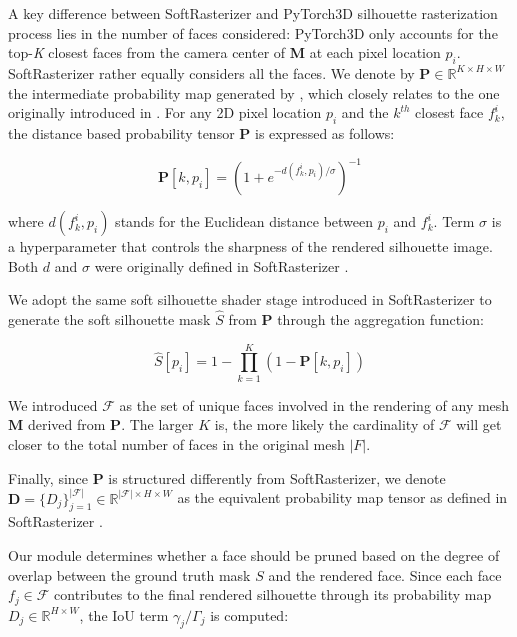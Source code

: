 A key difference between SoftRasterizer and PyTorch3D silhouette rasterization process lies in the number of faces considered: PyTorch3D only accounts for the top-\textit{K} closest faces from the camera center of \textbf{M} at each pixel location $p_i$. SoftRasterizer rather equally considers all the faces. 
We denote by $\mathbf{P}\in \mathbb{R}^{K \times H \times W}$ the intermediate probability map generated by \citep{ravi2020accelarating}, which closely relates to the one originally introduced in \citep{liu2019soft}. For any 2D pixel location $p_{i}$ and the $k^{th}$ closest face $f_{k}^{i}$, the distance based probability tensor $\mathbf{P}$ is expressed as follows:

\begin{equation}
    \mathbf{P}[k,p_{i}]=\left(1+e^{-d(f_{k}^{i},p_{i})/\sigma}\right)^{-1} 
\end{equation}

where $d(f_{k}^{i},p_{i})$ stands for the Euclidean distance between $p_i$ and $f_{k}^{i}$. Term $\sigma$ is a hyperparameter that controls the sharpness of the rendered silhouette image. Both $d$ and $\sigma$ were originally defined in SoftRasterizer \citep{liu2019soft}. \newline

We adopt the same soft silhouette shader stage introduced in SoftRasterizer to generate the soft silhouette mask $\hat{S}$ from $\mathbf{P}$ through the aggregation function:

\begin{equation}
    \hat{S}[p_i]=1 - \prod_{k=1}^{K} (1 - \mathbf{P}[k,p_{i}])
\end{equation}

We introduced $\mathcal{F}$ as the set of unique faces involved in the rendering of any mesh $\mathbf{M}$ derived from $\mathbf{P}$. The larger $K$ is, the more likely the cardinality of $\mathcal{F}$ will get closer to the total number of faces in the original mesh $|F|$. 

Finally, since $\mathbf{P}$ is structured differently from SoftRasterizer, we denote $\mathbf{D}=\{D_{j}\}_{j=1}^{|\mathcal{F}|}\in \mathbb{R}^{|\mathcal{F}|\times H\times W}$  as the equivalent probability map tensor as defined in SoftRasterizer \citep{liu2019soft}.

Our module determines whether a face should be pruned based on the degree of overlap between the ground truth mask $S$ and the rendered face. Since each face $f_{j} \in \mathcal{F}$ contributes to the final rendered silhouette through its probability map $D_{j}\in \mathbb{R}^{H\times W}$, the \ac{IoU} term $\gamma_{j}/\Gamma_{j}$ is computed: 

